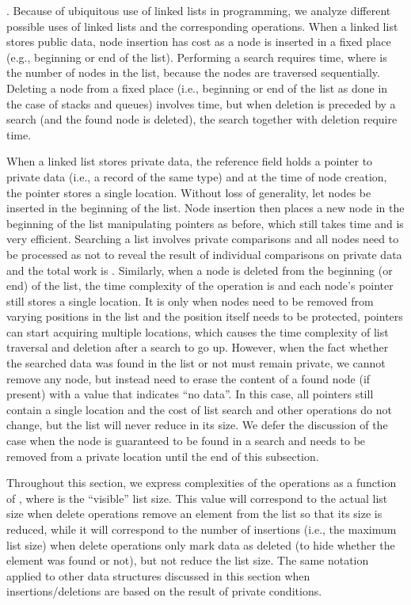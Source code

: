 \documentclass[11pt]{article}
\begin{document}
\medskip {}. Because of ubiquitous use of
linked lists in programming, we analyze different possible uses of linked
lists and the corresponding operations. When a linked list stores public
data, node insertion has cost  as a node is inserted in a fixed place
(e.g., beginning or end of the list). Performing a search requires 
time, where  is the number of nodes in the list, because the nodes are
traversed sequentially. Deleting a node from a fixed place (i.e., beginning
or end of the list as done in the case of stacks and queues) involves 
time, but when deletion is preceded by a search (and the found node is
deleted), the search together with deletion require  time.

When a linked list stores private data, the reference field holds a pointer
to private data (i.e., a record of the same type) and at the time of node
creation, the pointer stores a single location. Without loss of generality,
let nodes be inserted in the beginning of the list. Node insertion then
places a new node in the beginning of the list manipulating pointers as
before, which still takes  time and is very efficient. Searching a
list involves  private comparisons and all nodes need to be processed as
not to reveal the result of individual comparisons on private data and the
total work is . Similarly, when a node is deleted from the beginning
(or end) of the list, the time complexity of the operation is  and
each node's pointer still stores a single location. It is only when nodes
need to be removed from varying positions in the list and the position
itself needs to be protected, pointers can start acquiring multiple
locations, which causes the time complexity of list traversal and deletion
after a search to go up. However, when the fact whether the searched data
was found in the list or not must remain private, we cannot remove any node,
but instead need to erase the content of a found node (if present) with a
value that indicates ``no data''. In this case, all pointers still contain a
single location and the cost of list search and other operations do not
change, but the list will never reduce in its size. We defer the discussion
of the case when the node is guaranteed to be found in a search and needs to
be removed from a private location until the end of this subsection. 

Throughout this section, we express complexities of the operations as a
function of , where  is the ``visible'' list size. This value will
correspond to the actual list size when delete operations remove an element
from the list so that its size is reduced, while it will correspond to the
number of insertions (i.e., the maximum list size) when delete operations
only mark data as deleted (to hide whether the element was found or not),
but not reduce the list size. The same notation applied to other data
structures discussed in this section when insertions/deletions are based on
the result of private conditions.
\end{document}
